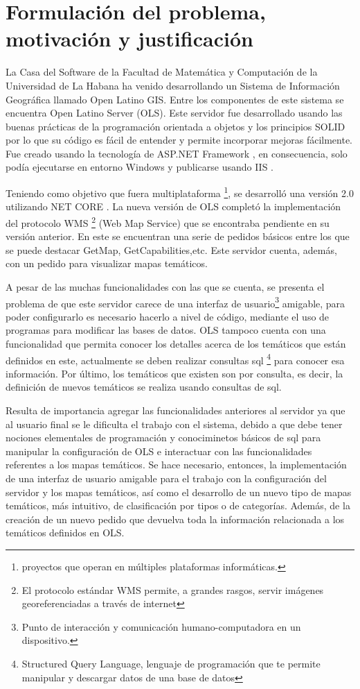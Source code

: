\section{Formulaci\'on del problema, motivaci\'on y justificaci\'on}

La Casa del Software de la Facultad de Matem\'atica y Computaci\'on de la Universidad de La Habana ha venido desarrollando un Sistema de Informaci\'on Geogr\'afica llamado Open Latino GIS. Entre los componentes de este sistema se encuentra Open Latino Server (OLS). Este servidor fue desarrollado usando las buenas pr\'acticas de la programaci\'on orientada a objetos \cite{OO} y los principios SOLID \cite{solid} por lo que su c\'odigo es f\'acil de entender y permite incorporar mejoras f\'acilmente. Fue creado usando la tecnolog\'ia de ASP.NET Framework \cite{aspnet}, en consecuencia, solo pod\'ia ejecutarse en entorno Windows y publicarse usando IIS \cite{iis}.

Teniendo como objetivo que fuera multiplataforma \footnote{proyectos que operan en m\'ultiples plataformas inform\'aticas.}, se desarroll\'o una versi\'on 2.0 utilizando NET CORE \cite{netcore}. La nueva versi\'on de OLS complet\'o la implementaci\'on del protocolo WMS \footnote{El protocolo est\'andar WMS permite, a grandes rasgos, servir im\'agenes georeferenciadas a trav\'es de internet} (Web Map Service) \cite{wms} que se encontraba pendiente en su versi\'on anterior. En este se encuentran una serie de pedidos b\'asicos entre los que se puede destacar GetMap, GetCapabilities,etc. Este servidor cuenta, adem\'as, con un pedido para visualizar mapas tem\'aticos.

A pesar de las muchas funcionalidades con las que se cuenta, se presenta el problema de que este servidor carece de una interfaz de usuario\footnote{Punto de interacci\'on y comunicaci\'on humano-computadora en un dispositivo.} amigable, para poder configurarlo es necesario hacerlo a nivel de c\'odigo, mediante el uso de programas para modificar las bases de datos. OLS tampoco cuenta con una funcionalidad que permita conocer los detalles acerca de los tem\'aticos que est\'an definidos en este, actualmente se deben realizar consultas sql \footnote{Structured Query Language, lenguaje de programaci\'on que te permite manipular y descargar datos de una base de datos} para conocer esa informaci\'on. Por \'ultimo, los tem\'aticos que existen son por consulta, es decir, la definici\'on de nuevos tem\'aticos se realiza usando consultas de sql.

Resulta de importancia agregar las funcionalidades anteriores al servidor ya que al usuario final se le dificulta el trabajo con el sistema, debido a que debe tener nociones elementales de programaci\'on y conociminetos b\'asicos de sql para manipular la configuraci\'on de OLS e interactuar con las funcionalidades referentes a los mapas tem\'aticos. Se hace necesario, entonces, la implementaci\'on de una interfaz de usuario amigable para el trabajo con la configuraci\'on del servidor y los mapas tem\'aticos, as\'i como el desarrollo de un nuevo tipo de mapas tem\'aticos, m\'as intuitivo, de clasificaci\'on por tipos o de categor\'ias. Adem\'as, de la creaci\'on de un nuevo pedido que devuelva toda la informaci\'on relacionada a los tem\'aticos definidos en OLS.

